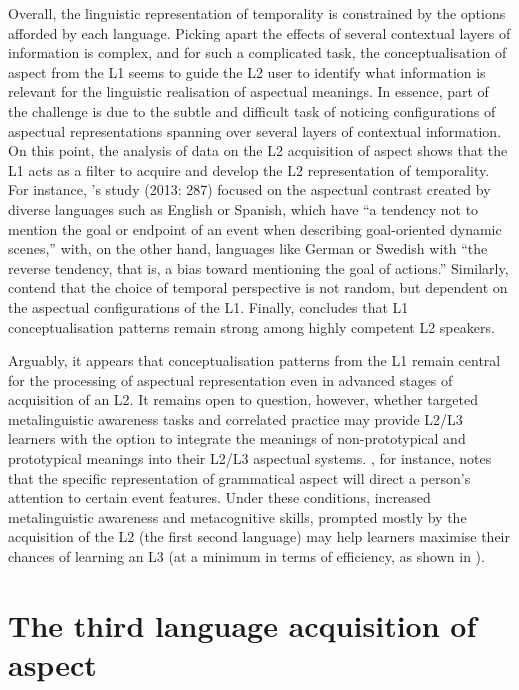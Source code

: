 \documentclass[output=paper,modfonts,nonflat,newtxmath]{langsci/langscibook}
\begin{document}
Overall, the linguistic representation of temporality is constrained by the options afforded by each language. Picking apart the effects of several contextual layers of information is complex, and for such a complicated task, the conceptualisation of aspect from the L1 seems to guide the L2 user to identify what information is relevant for the linguistic realisation of aspectual meanings. In essence, part of the challenge is due to the subtle and difficult task of noticing configurations of aspectual representations spanning over several layers of contextual information. On this point, the analysis of data on the L2 acquisition of aspect shows that the L1 acts as a filter to acquire and develop the L2 representation of temporality. For instance, \citeauthor{AthanasopoulosBylund2013}'s study (2013: 287) focused on the aspectual contrast created by diverse languages such as English or Spanish, which have “a tendency not to mention the goal or endpoint of an event when describing goal-oriented dynamic scenes,” with, on the other hand, languages like German or Swedish with “the reverse tendency, that is, a bias toward mentioning the goal of actions.” Similarly, \citet{SchmiedtovaEtAl2011} contend that the choice of temporal perspective is not random, but dependent on the aspectual configurations of the L1. Finally, \citet[116]{Bylund2011} concludes that L1 conceptualisation patterns remain strong among highly competent L2 speakers.

Arguably, it appears that conceptualisation patterns from the L1 remain central for the processing of aspectual representation even in advanced stages of acquisition of an L2. It remains open to question, however, whether targeted metalinguistic awareness tasks and correlated practice may provide L2/L3 learners with the option to integrate the meanings of non-prototypical and prototypical meanings into their L2/L3 aspectual systems. \citet{Bylund2011}, for instance, notes that the specific representation of grammatical aspect will direct a person’s attention to certain event features. Under these conditions, increased metalinguistic awareness and metacognitive skills, prompted mostly by the acquisition of the L2 (the first second language) may help learners maximise their chances of learning an L3 (at a minimum in terms of efficiency, as shown in \citealt{NayakEtAl1990}).

\section{The third language acquisition of aspect}%
\label{sec:salaberry:3}
\end{document}
